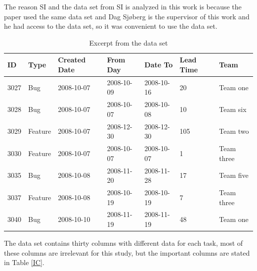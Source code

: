 \documentclass[UKenglish]{ifimaster}  %
\begin{document}
The reason SI and the data set from SI is analyzed in this work is because the paper \parencite{Dag} used the same data set and Dag Sj\o berg is the supervisor of this work and he had access to the data set, so it was convenient to use the data set.

\begin{table}[!ht]
\begin{center}
\caption{Excerpt from the data set}
\begin{tabular}{|l|l|l|l|l|l|l|}
\hline
ID	& Type &  Created Date & From Day & Date To & Lead Time & Team \\ \hline
    3027 & Bug & 2008-10-07 &  2008-10-09 & 2008-10-16 & 20 & Team one\\ \hline
   3028 & Bug  & 2008-10-07 & 2008-10-07 & 2008-10-08 & 10 & Team six\\ \hline
   3029 & Feature & 2008-10-07 &  2008-12-30	 & 2008-12-30 & 105 & Team two\\ \hline
    3030 & Feature & 2008-10-07 & 2008-10-07	& 2008-10-07 & 1& Team three\\ \hline
   3035 & Bug & 2008-10-08 & 2008-11-20 & 2008-11-28 & 17 & Team five\\ \hline
   3037 & Feature & 2008-10-08 &  2008-10-19	 & 2008-10-19 & 7 & Team three\\ \hline
   3040 & Bug & 2008-10-10 &  2008-11-19 & 2008-11-19 & 48 & Team one\\ \hline
   \end{tabular}
\label{dataset}
\end{center}
\end{table}

The data set contains thirty columns with different data for each task, most of these columns are irrelevant for this study, but the important columns are stated in Table \ref{IC}.
\end{document}
